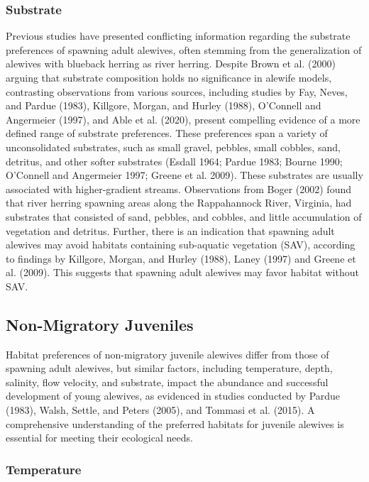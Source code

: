 \documentclass[
]{book}
\begin{document}
\hypertarget{substrate}{%
\subsubsection{Substrate}\label{substrate}}

Previous studies have presented conflicting information regarding the substrate preferences of spawning adult alewives, often stemming from the generalization of alewives with blueback herring as river herring. Despite Brown et al. (2000) arguing that substrate composition holds no significance in alewife models, contrasting observations from various sources, including studies by Fay, Neves, and Pardue (1983), Killgore, Morgan, and Hurley (1988), O'Connell and Angermeier (1997), and Able et al. (2020), present compelling evidence of a more defined range of substrate preferences. These preferences span a variety of unconsolidated substrates, such as small gravel, pebbles, small cobbles, sand, detritus, and other softer substrates (Esdall 1964; Pardue 1983; Bourne 1990; O'Connell and Angermeier 1997; Greene et al. 2009). These substrates are usually associated with higher-gradient streams. Observations from Boger (2002) found that river herring spawning areas along the Rappahannock River,
Virginia, had substrates that consisted of sand, pebbles, and cobbles, and little accumulation of vegetation and detritus. Further, there is an indication that spawning adult alewives may avoid habitats containing sub-aquatic vegetation (SAV), according to findings by Killgore, Morgan, and Hurley (1988), Laney (1997) and Greene et al. (2009). This suggests that spawning adult alewives may favor habitat without SAV.

\hypertarget{non-migratory-juveniles}{%
\subsection{Non-Migratory Juveniles}\label{non-migratory-juveniles}}

Habitat preferences of non-migratory juvenile alewives differ from those of spawning adult alewives, but similar factors, including temperature, depth, salinity, flow velocity, and substrate, impact the abundance and successful development of young alewives, as evidenced in studies conducted by Pardue (1983), Walsh, Settle, and Peters (2005), and Tommasi et al. (2015). A comprehensive understanding of the preferred habitats for juvenile alewives is essential for meeting their ecological needs.

\hypertarget{temperature-1}{%
\subsubsection{Temperature}\label{temperature-1}}
\end{document}
